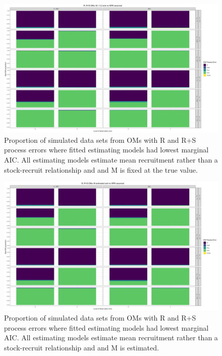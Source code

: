 \documentclass[
  12pt,
]{article}
\begin{document}
\begin{landscape}
\begin{figure}
\caption{Proportion of simulated data sets from OMs with R and R+S process errors where fitted estimating models had lowest marginal AIC. All estimating models estimate mean recruitment rather than a stock-recruit relationship and and M is fixed at the true value.} \label{naa_om_proportion_best_aic_R_MF}
\begin{center}
\includegraphics[width = \textwidth]{naa_om_proportion_best_aic_R_MF.png}
\end{center}
\end{figure}
\end{landscape}

\begin{landscape}
\begin{figure}
\caption{Proportion of simulated data sets from OMs with R and R+S process errors where fitted estimating models had lowest marginal AIC. All estimating models estimate mean recruitment rather than a stock-recruit relationship and and M is estimated.} \label{naa_om_proportion_best_aic_R_ME}
\begin{center}
\includegraphics[width = \textwidth]{naa_om_proportion_best_aic_R_ME.png}
\end{center}
\end{figure}
\end{landscape}
\end{document}
